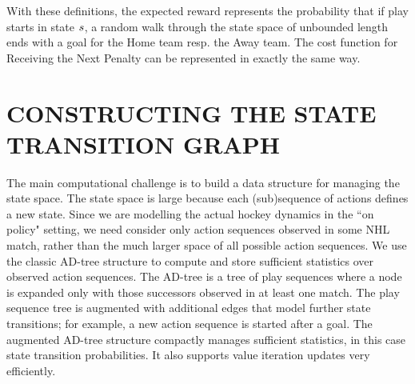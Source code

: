 \documentclass[]{article}
\begin{document}
With these definitions, the expected reward %
%
represents the probability that if play starts in state $s$, a random walk through the state space of unbounded length ends with a goal for the Home team resp. the Away team. The cost function for Receiving the Next Penalty can be represented in exactly the same way.
%


\section{CONSTRUCTING THE STATE TRANSITION GRAPH}
\label{subsec:mdp-construction}

The main computational challenge is to build a data structure for managing the state space. The state space is large because each (sub)sequence of actions defines a new state. Since we are modelling the actual hockey dynamics in the ``on policy" setting, we need consider only action sequences observed in some NHL match, rather than the much larger space of all possible action sequences. We use the classic AD-tree structure \citep{Moore1998} to compute and store sufficient statistics over observed action sequences.
The AD-tree is a tree of play sequences where a node is expanded only with those successors observed in at least one match.
The play sequence tree is augmented with additional edges that model further state transitions; for example, a new action sequence is started after a goal.
The augmented AD-tree structure compactly manages sufficient statistics, in this case state transition probabilities.
It also supports value iteration updates very efficiently.
\end{document}
